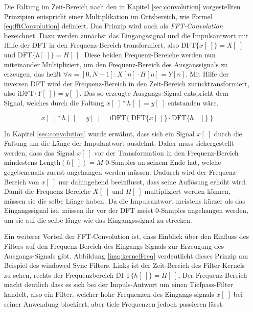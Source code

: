 Die Faltung im Zeit-Bereich nach den in Kapitel \ref{sec:convolution} vorgestellten Prinzipien entspricht einer Multiplikation im Ortsbereich, wie Formel \ref{eq:fftConvolution} definiert. Das Prinzip wird auch als \emph{FFT-Convolution} bezeichnet. Dazu werden zunächst das Eingangssignal und die Impulsantwort mit Hilfe der DFT in den Frequenz-Bereich transformiert, also $\text{DFT}\{x[\;]\} = X[\;]$ und $\text{DFT}\{h[\;]\} = H[\;]$. Diese beiden Frequenz-Bereiche werden nun miteinander Multipliziert, um den Frequenz-Bereich des Ausganssignals zu erzeugen, das heißt $\forall n = [0,N-1]: X[n] \cdot H[n] = Y[n]$. Mit Hilfe der inversen DFT wird der Frequenz-Bereich in den Zeit-Bereich zurücktransformiert, also $\text{iDFT}\{ Y[\;] \} = y[\;]$. Das so erzeugte Ausgangs-Signal entspricht dem Signal, welches durch die Faltung $x[\;] * h[\;] = y[\;]$ entstanden wäre.\cite[S. 182]{dspGuide}

\begin{equation}
x[\;] * h[\;] = y[\;] = \text{iDFT}\Big\{\ \text{DFT}\{x[\;]\} \cdot \text{DFT}\{h[\;]\}\ \Big\}
\label{eq:fftConvolution}
\end{equation}

In Kapitel \ref{sec:convolution} wurde erwähnt, dass sich ein Signal $x[\;]$ durch die Faltung um die Länge der Impulantwort ausdehnt. Daher muss sichergestellt werden, dass das Signal $x[\;]$ vor der Transformation in den Frequenz-Bereich mindestens Length$(h[\;]) = M$ 0-Samples an seinem Ende hat, welche gegebenenalls zuerst angehangen werden müssen. Dadurch wird der Frequenz-Bereich von $x[\;]$ nur dahingehend beeinflusst, dass seine Auflösung erhöht wird. Damit die Frequenz-Bereiche $ X[\;]$ und $H[\;]$ multipliziert werden können, müssen sie die selbe Länge haben. Da die Impulsantwort meistens kürzer als das Eingangssignal ist, müssen ihr vor der DFT meist 0-Samples angehangen werden, um sie auf die selbe länge wie das Eingangsssignal \glqq zu strecken\grqq{}.\cite[S. 183 -184]{dspGuide}

Ein weiterer Vorteil der FFT-Convolution ist, dass Einblick über den Einfluss des Filters auf den Frequenz-Bereich des Eingangs-Signals zur Erzeugung des Ausgangs-Signals gibt. Abbildung \ref{img:kernelFreq} verdeutlicht dieses Prinzip am Beispiel des \glqq windowed Sync Filters\grqq.  Links ist der Zeit-Bereich des Filter-Kernels zu sehen, rechts der Frequenzbereich $\text{DFT}\{h[\;]\} = H[\;]$. Der Frequenz-Bereich macht deutlich dass es sich bei der Impuls-Antwort um einen Tiefpass-Filter handelt, also ein Filter, welcher hohe Frequenzen des Eingangs-signals $x[\;]$ bei seiner Anwendung blockiert, aber tiefe Frequenzen jedoch passieren lässt.\cite[S. 180]{dspGuide}

